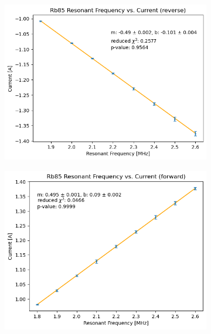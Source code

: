 \documentclass[10pt]{article}
\begin{document}
	\begin{figure}
		\centering
		\begin{subfigure}{0.4\textwidth}
			\includegraphics[scale=0.4]{images/rb85-neg-weighted.png}
			\caption{}
		\end{subfigure}
		\begin{subfigure}{0.4\textwidth}
			\includegraphics[scale=0.4]{images/rb85-pos-weighted.png}
			\caption{}
		\end{subfigure}
		\begin{subfigure}{0.4\textwidth}

\end{subfigure}
\end{figure}
\end{document}
